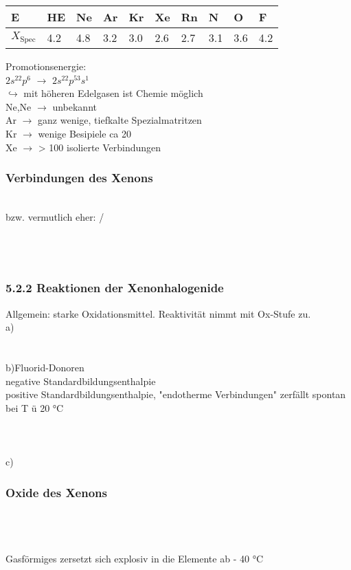 \documentclass{article}
\begin{document}
\begin{tabular}{l|llllll|lll}
    \hline
    E&HE&Ne&Ar&Kr&Xe&Rn&N&O&F\\
    \hline
    $X_{\mathrm{Spec}}$&4.2&4.8&3.2&3.0&2.6&2.7&3.1&3.6&4.2\\
\end{tabular}
Promotionsenergie:\\
$2s^22p^6$ $\rightarrow$ $2s^22p^53s^1$\\
$\hookrightarrow$ mit höheren Edelgasen ist Chemie möglich\\
Ne,Ne $\rightarrow$ unbekannt\\
Ar $\rightarrow$ ganz wenige, tiefkalte Spezialmatritzen\\
Kr $\rightarrow$ wenige Besipiele ca 20\\
Xe $\rightarrow$ > 100 isolierte Verbindungen\\
\subsubsection{Verbindungen des Xenons}
\\
 bzw. vermutlich eher: \ce{[XeF]^+ [PtF5]^-} / \ce{[XeF]^+[Pt2F11]}\\\\
\\
\\

\subsubsection{5.2.2 Reaktionen der Xenonhalogenide}
Allgemein:  starke Oxidationsmittel. Reaktivität nimmt mit Ox-Stufe zu.\\
a)
\\
\\
\\
b)Fluorid-Donoren\\
 negative Standardbildungsenthalpie\\
 positive Standardbildungsenthalpie, "endotherme Verbindungen" zerfällt spontan bei T ü 20 °C\\
\\
\\
\\
c)\\

\subsubsection{Oxide des Xenons}
\\
\\
\\
Gasförmiges  zersetzt sich explosiv in die Elemente ab - 40 °C\\
\end{document}
